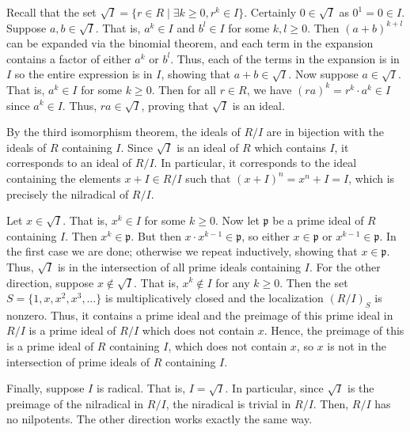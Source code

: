 \documentclass[../../master.tex]{subfiles}
\begin{document}
\begin{solution}
    Recall that the set $\sqrt{I} = \{r \in R \mid \exists k \geq 0, r^{k} \in I\}$.
    Certainly $0 \in \sqrt{I}$ as $0^{1} = 0 \in I$.
    Suppose $a, b \in \sqrt{I}$.
    That is, $a^{k} \in I$ and $b^{l} \in I$ for some $k, l \geq 0$.
    Then $(a + b)^{k + l}$ can be expanded via the binomial theorem, and each term in the expansion contains a factor of either $a^{k}$ or $b^{l}$.
    Thus, each of the terms in the expansion is in $I$ so the entire expression is in $I$, showing that $a + b \in \sqrt{I}$.
    Now suppose $a \in \sqrt{I}$.
    That is, $a^{k} \in I$ for some $k \geq 0$.
    Then for all $r \in R$, we have $(ra)^{k} = r^{k} \cdot a^{k} \in I$ since $a^{k} \in I$.
    Thus, $ra \in \sqrt{I}$, proving that $\sqrt{I}$ is an ideal.

    By the third isomorphism theorem, the ideals of $R / I$ are in bijection with the ideals of $R$ containing $I$.
    Since $\sqrt{I}$ is an ideal of $R$ which contains $I$, it corresponds to an ideal of $R / I$.
    In particular, it corresponds to the ideal containing the elements $x + I \in R / I$ such that $(x + I)^{n} = x^{n} + I = I$, which is precisely the nilradical of $R / I$.

    Let $x \in \sqrt{I}$.
    That is, $x^{k} \in I$ for some $k \geq 0$.
    Now let $\mathfrak{p}$ be a prime ideal of $R$ containing $I$.
    Then $x^{k} \in \mathfrak{p}$.
    But then $x \cdot x^{k - 1} \in \mathfrak{p}$, so either $x \in \mathfrak{p}$ or $x^{k-1} \in \mathfrak{p}$.
    In the first case we are done; otherwise we repeat inductively, showing that $x \in \mathfrak{p}$.
    Thus, $\sqrt{I}$ is in the intersection of all prime ideals containing $I$.
    For the other direction, suppose $x \notin \sqrt{I}$.
    That is, $x^{k} \notin I$ for any $k \geq 0$.
    Then the set $S = \{1, x, x^2, x^3, \ldots\}$ is multiplicatively closed and the localization $(R / I)_S$ is nonzero.
    Thus, it contains a prime ideal and the preimage of this prime ideal in $R / I$ is a prime ideal of $R / I$ which does not contain $x$.
    Hence, the preimage of this is a prime ideal of $R$ containing $I$, which does not contain $x$, so $x$ is not in the intersection of prime ideals of $R$ containing $I$.

    Finally, suppose $I$ is radical.
    That is, $I = \sqrt{I}$.
    In particular, since $\sqrt{I}$ is the preimage of the nilradical in $R / I$, the niradical is trivial in $R / I$.
    Then, $R / I$ has no nilpotents.
    The other direction works exactly the same way.
\end{solution}
\end{document}
